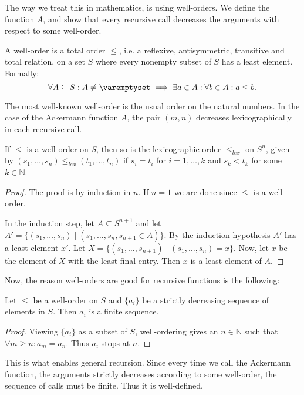 \documentclass[a4paper, 12pt]{article}
\newcommand{\N}{\mathbb{N}}
\theoremstyle{changedot}
\theoremstyle{changedotbreak}
\theoremstyle{nonumberplain}
\newtheorem{proof}{Proof}
\begin{document}
The way we treat this in mathematics, is using well-orders. We define the function $A$, and show that every recursive call decreases the arguments with respect to some well-order.

\begin{definition}
  A well-order is a total order $\leq$, i.e. a reflexive, antisymmetric, transitive and total relation, on a set $S$ where every nonempty subset of $S$ has a least element. Formally:
  \[\forall A \subseteq S : A \neq \varemptyset \implies \exists a \in A: \forall b \in A: a \leq b.\]
\end{definition}

The most well-known well-order is the usual order on the natural numbers. In the case of the Ackermann function $A$, the pair $(m, n)$ decreases lexicographically in each recursive call.

\begin{proposition}
  If $\leq$ is a well-order on $S$, then so is the lexicographic order $\leq_{lex}$ on $S^{n}$, given by $(s_{1}, \dots, s_{n}) \leq_{lex} (t_{1}, \dots, t_{n})$ if $s_{i} = t_{i}$ for $i=1, \dots, k$ and $s_{k} < t_{k}$ for some $k \in \N$.
\end{proposition}
\begin{proof}
  The proof is by induction in $n$. If $n = 1$ we are done since $\leq$ is a well-order.

  In the induction step, let $A \subseteq S^{n+1}$ and let $A' = \{(s_{1}, \dots, s_{n}) \mid (s_{1}, \dots, s_{n}, s_{n+1} \in A)\}$. By the induction hypothesis $A'$ has a least element $x'$. Let $X = \{(s_{1}, \dots, s_{n+1}) \mid (s_{1}, \dots, s_{n}) = x\}$. Now, let $x$ be the element of $X$ with the least final entry. Then $x$ is a least element of $A$.
\end{proof}

Now, the reason well-orders are good for recursive functions is the following:

\begin{proposition}
  Let $\leq$ be a well-order on $S$ and $\{a_{i}\}$ be a strictly decreasing sequence of elements in $S$. Then $a_{i}$ is a finite sequence. 
\end{proposition}
\begin{proof}
  Viewing $\{a_{i}\}$ as a subset of $S$, well-ordering gives an $n \in \N$ such that $\forall m \geq n: a_{m} = a_{n}$. Thus $a_{i}$ stops at $n$.
\end{proof}

This is what enables general recursion. Since every time we call the Ackermann function, the arguments strictly decreases according to some well-order, the sequence of calls must be finite. Thus it is well-defined.
\end{document}
